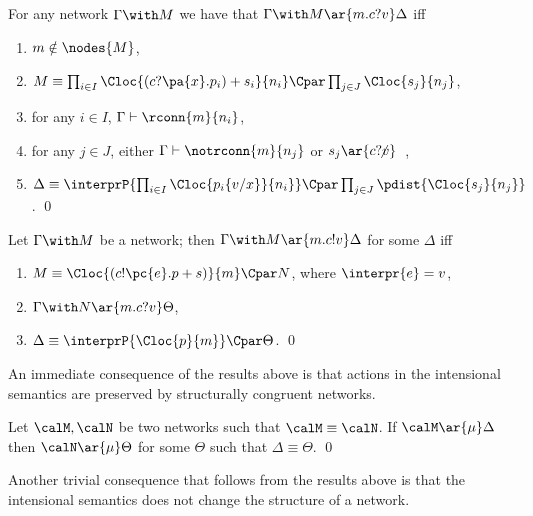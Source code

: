 \documentclass{LMCS}
\begin{document}
\begin{prop}[Input]
\label{prop:input}
For any network $\Gamma \with M$ we have that 
$\Gamma \with M \ar{m.c?v} \Delta$ iff
\begin{enumerate}[label=(\roman*)]
\item $m \notin \nodes{M}$, 
\item $M \equiv \prod_{i \in I} \Cloc{(c?\pa{x}.p_i) + s_i}{n_i} 
\Cpar \prod_{j \in J} \Cloc{s_j}{n_j}$, 
\item for any $i \in I$, $\Gamma \vdash \rconn{m}{n_i}$, 
\item for any $j \in J$, either $\Gamma \vdash \notrconn{m}{n_j}$ 
or $s_j \ar{c?v}\;\hspace{-15pt}{\not\;}{\hspace{15pt}}$, 
\item $\Delta \equiv \interprP{\prod_{i \in I} \Cloc{p_i\{v/x\}}{n_i}} 
\Cpar \prod_{j \in J} \pdist{\Cloc{s_j}{n_j}}$.
\qed
\end{enumerate}

\end{prop}

\begin{prop}[Broadcast]
\label{prop:broadcast}
Let $\Gamma \with M$ be a network; then $\Gamma \with M \ar{m.c!v} 
\Delta$ for some $\Delta$ iff 
\begin{enumerate}[label=(\roman*)]
\item $M \equiv \Cloc{(c!\pc{e}.p + s)}{m} \Cpar N$, 
where $\interpr{e} = v$, 
\item $\Gamma \with N \ar{m.c?v} \Theta$, 
\item $\Delta \equiv \interprP{\Cloc{p}{m}} \Cpar \Theta$.
\qed
\end{enumerate}

\end{prop}

\noindent An immediate consequence of the results above is 
that actions in the intensional semantics 
are preserved by structurally congruent networks.
\begin{cor}
\label{cor:reduction}
Let $\calM, \calN$ be two networks 
such that $\calM \equiv \calN$. 
If $\calM \ar{\mu} \Delta$ then 
$\calN \ar{\mu} \Theta$ for some 
$\Theta$ such that $\Delta \equiv \Theta$.
\qed
\end{cor}

Another trivial consequence that follows from 
the results above is that the intensional 
semantics does not change the structure 
of a network. 
\end{document}
